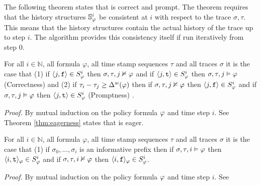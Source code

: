 The following theorem states that \monitor is correct and prompt. The theorem requires that the history structures $\mathbb{S}^{i}_{\varphi}$ be consistent at $i$ with respect to the trace $\sigma,\tau$. This means that the history structures contain the actual history of the trace up to step $i$. The algorithm provides this consistency itself if run iteratively from step $0$.

\begin{theorem}
For all $i \in \mathbb{N}$, all formula $\varphi$, all time stamp sequences $\tau$ and all traces $\sigma$ it is the case that (1) if $\langle j, \mathrm{\texttt{f}} \rangle \in {S}^{i}_{\varphi}$ then $\sigma, \tau, j \nvDash \varphi$ and if $\langle j, \mathrm{\texttt{t}} \rangle \in {S}^{i}_{\varphi}$ then $\sigma, \tau, j \vDash \varphi$ (Correctness) and (2) if $\tau_i - \tau_j \geq \Delta^w(\varphi)$ then if $\sigma, \tau, j \nvDash \varphi$ then $\langle j, \mathrm{\texttt{f}} \rangle \in {S}^{i}_{\varphi}$ and if $\sigma, \tau, j \vDash \varphi$ then $\langle j, \mathrm{\texttt{t}} \rangle \in {S}^{i}_{\varphi}$ (Promptness)
.
\end{theorem}
\textit{Proof.} By mutual induction on the policy formula $\varphi$ and time step $i$. See \cite{TechPaper} \\

Theorem \ref{thm:eagerness} states that \monitor is eager. 

\begin{theorem}
\label{thm:eagerness}
For all $i \in \mathbb{N}$, all formula $\varphi$, all time stamp sequences $\tau$ and all traces $\sigma$ it is the case that (1) if $\sigma_0,\ldots,\sigma_i$ is an informative prefix then if $\sigma,\tau, i \vDash \varphi$ then $\langle i, \mathrm{\texttt{t}} \rangle_{\varphi} \in {S}^{i}_{\varphi}$ and if $\sigma, \tau, i \nvDash \varphi$ then $\langle i, \mathrm{\texttt{f}} \rangle_{\varphi} \in {S}^{i}_{\varphi}$. 
\end{theorem}
\textit{Proof.} By mutual induction on the policy formula $\varphi$ and time step $i$. See \cite{TechPaper}
